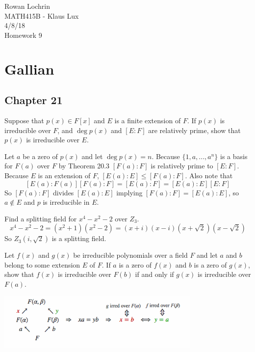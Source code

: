 \documentclass[11pt]{article}
\begin{document}
\begin{flushleft}
Rowan Lochrin \\
MATH415B - Klaus Lux \\
4/8/18 \\
Homework 9
\end{flushleft}

\section{Gallian}
\begin{description}
\subsection{Chapter 21}

\item[19] Suppose that $p(x) \in F[x]$ and $E$ is a finite extension of $F$. If
	$p(x)$ is irreducible over $F$, and $\deg p(x)$ and $[E:F]$ are
	relatively prime, show that $p(x)$ is irreducible over $E$.

	Let $a$ be a zero of $p(x)$ and let $\deg p(x) = n$. Because $\{1, a, ...
	,a^n \}$ is a basis for $F(a)$ over $F$ by Theorem 20.3 
	$[F(a):F]$ is relatively prime to $[E:F]$. Because $E$ is an
	extension of $F$, $[E(a):E] \leq [F(a):F]$. Also note that
	$$[E(a):F(a)][F(a):F] = [E(a):F] = [E(a):E][E:F] $$
	So $ [F(a):F] $ divides $[E(a):E]$ implying $[F(a):F]=[E(a):E]$, so
	$a \notin E$ and $p$ is irreducible in $E$.
\item[24] Find a splitting field for $x^4 - x^2 - 2$ over $Z_3$.
	$$x^4-x^2-2 = (x^2+1)(x^2-2) = (x+i)(x-i)(x+\sqrt2)(x-\sqrt2)$$
	So $Z_3(i,\sqrt2)$ is a splitting field.
\item[32] Let $f(x)$ and $g(x)$ be irreducible polynomials over a field $F$ and
	let $a$ and $b$ belong to some extension $E$ of $F$. If $a$ is a zero of
	$f(x)$ and $b$ is a zero of $g(x)$, show that  $f(x)$ is
	irreducible over $F(b)$ if and only if $g(x)$ is irreducible
	over $F(a)$.
		
\begin{center}
\includegraphics[width=0.75\textwidth]{images/fig1} 
\end{center}


\end{description}
\end{document}

